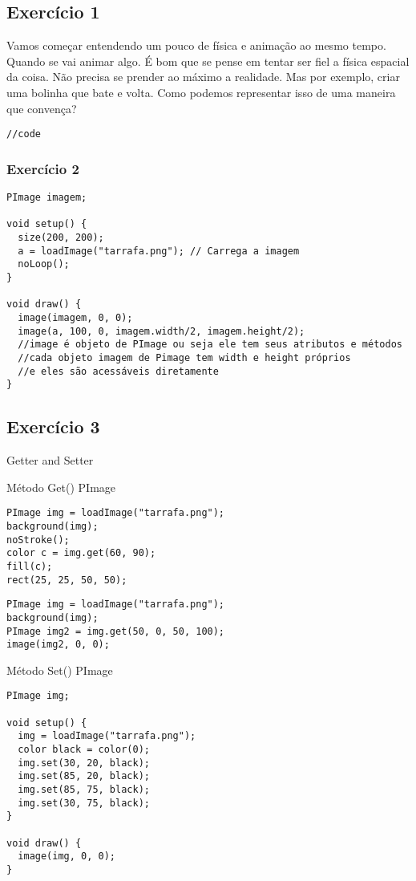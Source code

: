 \documentclass[12pt]{article}
\begin{document}
\subsection{Exercício 1}

\qquad Vamos começar entendendo um pouco de física e animação ao mesmo tempo. Quando se vai animar algo. É bom que se pense em tentar ser fiel a física espacial da coisa. Não precisa se prender ao máximo a realidade. Mas por exemplo, criar uma bolinha que bate e volta. Como podemos representar isso de uma maneira que convença?


\begin{verbatim}
//code
\end{verbatim}

\subsubsection{Exercício 2}

\begin{verbatim}
PImage imagem;

void setup() {
  size(200, 200);
  a = loadImage("tarrafa.png"); // Carrega a imagem
  noLoop();
}

void draw() {
  image(imagem, 0, 0);
  image(a, 100, 0, imagem.width/2, imagem.height/2);
  //image é objeto de PImage ou seja ele tem seus atributos e métodos
  //cada objeto imagem de Pimage tem width e height próprios
  //e eles são acessáveis diretamente
}
\end{verbatim}

\subsection{Exercício 3}

\qquad Getter and Setter

\qquad Método Get() PImage

\begin{verbatim}
PImage img = loadImage("tarrafa.png");
background(img);
noStroke();
color c = img.get(60, 90);
fill(c);
rect(25, 25, 50, 50);
\end{verbatim}

\begin{verbatim}
PImage img = loadImage("tarrafa.png");
background(img);
PImage img2 = img.get(50, 0, 50, 100);
image(img2, 0, 0);
\end{verbatim}

\qquad Método Set() PImage

\begin{verbatim}
PImage img;

void setup() {
  img = loadImage("tarrafa.png");
  color black = color(0);
  img.set(30, 20, black);
  img.set(85, 20, black);
  img.set(85, 75, black);
  img.set(30, 75, black);
}

void draw() {
  image(img, 0, 0);
}
\end{verbatim}
\end{document}
